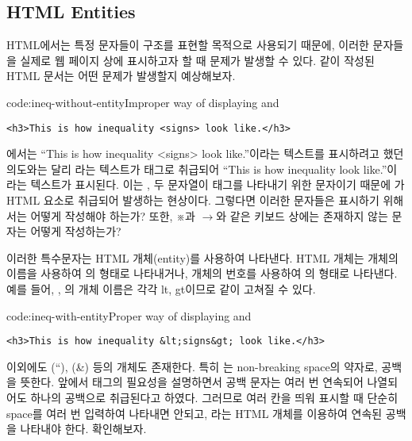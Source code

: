\subsection*{HTML Entities}

HTML에서는 특정 문자들이 구조를 표현할 목적으로 사용되기 때문에, 이러한 문자들을 실제로 웹 페이지 상에 표시하고자 할 때 문제가 발생할 수 있다. \와 같이 작성된 HTML 문서는 어떤 문제가 발생할지 예상해보자.

\begin{codeenv}{code:ineq-without-entity}{Improper way of displaying \cd{<} and \cd{>}}\begin{verbatim}
<h3>This is how inequality <signs> look like.</h3>
\end{verbatim}
\end{codeenv}

에서는 ``This is how inequality <signs> look like.''이라는 텍스트를 표시하려고 했던 의도와는 달리 라는 텍스트가 태그로 취급되어 ``This is how inequality look like.''이라는 텍스트가 표시된다. 이는 \cd{<}, \cd{>} 두 문자열이 태그를 나타내기 위한 문자이기 때문에 가 HTML 요소로 취급되어 발생하는 현상이다. 그렇다면 이러한 문자들은 표시하기 위해서는 어떻게 작성해야 하는가? 또한, ※과 $\rightarrow$와 같은 키보드 상에는 존재하지 않는 문자는 어떻게 작성하는가?

이러한 특수문자는 HTML 개체(entity)를 사용하여 나타낸다. HTML 개체는 개체의 이름을 사용하여 의 형태로 나타내거나, 개체의 번호를 사용하여 의 형태로 나타낸다. 예를 들어, \cd{<}, \cd{>}의 개체 이름은 각각 lt, gt이므로 \는 \와 같이 고쳐질 수 있다.

\begin{codeenv}{code:ineq-with-entity}{Proper way of displaying \cd{<} and \cd{>}}\begin{verbatim}
<h3>This is how inequality &lt;signs&gt; look like.</h3>
\end{verbatim}
\end{codeenv}

\label{etc:nbsp}
이외에도 (``), (\&) 등의 개체도 존재한다. 특히 는 non-breaking space의 약자로, 공백을 뜻한다. 앞에서  태그의 필요성을 설명하면서 공백 문자는 여러 번 연속되어 나열되어도 하나의 공백으로 취급된다고 하였다. 그러므로 여러 칸을 띄워 표시할 때 단순히 space를 여러 번 입력하여 나타내면 안되고, 라는 HTML 개체를 이용하여 연속된 공백을 나타내야 한다. \를 확인해보자.

